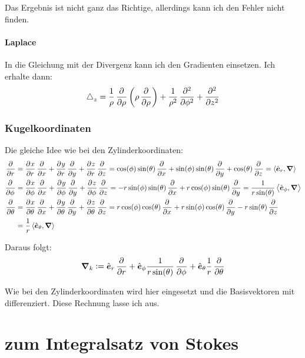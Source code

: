 \documentclass[11pt, ngerman, fleqn]{article}
\newcommand{\ev}{\hat{\vec e}}
\newcommand{\inner}[2]{\left\langle #1, #2 \right\rangle}
\newcommand{\laplace}{\mathop{{}\bigtriangleup}\nolimits}
\newcommand{\vnabla}{\vec \nabla}
\renewcommand{\vec}[1]{\boldsymbol{#1}}
\begin{document}
Das Ergebnis ist nicht ganz das Richtige, allerdings kann ich den Fehler nicht
finden.

\paragraph{Laplace}

In die Gleichung mit der Divergenz kann ich den Gradienten einsetzen. Ich erhalte dann:
\[
	\laplace_z = \frac 1\rho \dpd{}\rho \del{\rho \dpd {}\rho} + \frac 1{\rho^2} \dpd[2]{}\phi + \dpd[2]{}z
\]

\subsubsection{Kugelkoordinaten}

Die gleiche Idee wie bei den Zylinderkoordinaten:
\begin{align*}
	\dpd{}r &= \dpd xr \dpd{}x + \dpd yr \dpd{}y + \dpd zr \dpd{}z = \cos(\phi) \sin(\theta) \dpd{}x + \sin(\phi) \sin(\theta) \dpd{}y + \cos(\theta) \dpd{}z = \inner{\ev_r}\vnabla \\
 \dpd{}\phi &= \dpd x\phi \dpd{}x + \dpd y\phi \dpd{}y + \dpd z\phi \dpd{}z = - r \sin(\phi)\sin(\theta) \dpd{}x + r \cos(\phi) \sin(\theta) \dpd{}y = \frac 1{r \sin(\theta)} \inner{\ev_\phi}\vnabla \\
  \dpd{}\theta &= \dpd x\theta \dpd{}x + \dpd y\theta \dpd{}y + \dpd z\theta \dpd{}z = r \cos(\phi) \cos(\theta) \dpd{}x + r \sin(\phi) \cos(\theta) \dpd{}y - r \sin(\theta) \dpd{}z \\
			   &= \frac 1r \inner{\ev_\theta}\vnabla
\end{align*}

Daraus folgt:
\[
	\vnabla_k :=
	\ev_r
		\dpd{}r
	+\ev_\phi
		\frac 1{r \sin(\theta)} \dpd{}\phi
	+\ev_\theta
		\frac 1r \dpd{}\theta
\]

Wie bei den Zylinderkoordinaten wird hier eingesetzt und die Basisvektoren mit
differenziert. Diese Rechnung lasse ich aus.


\section{zum Integralsatz von Stokes}
\label{2}
\end{document}
